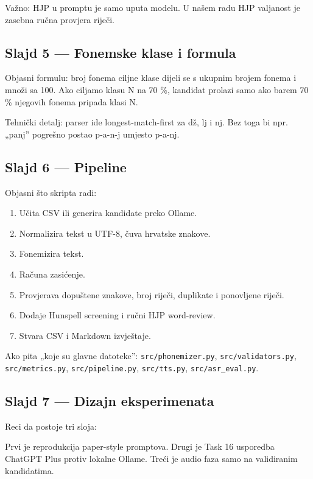 \documentclass[
]{article}
\providecommand{\tightlist}{%
  \setlength{\itemsep}{0pt}\setlength{\parskip}{0pt}}
\begin{document}
Važno: HJP u promptu je samo uputa modelu. U našem radu HJP valjanost je
zasebna ručna provjera riječi.

\subsection{Slajd 5 --- Fonemske klase i
formula}\label{slajd-5-fonemske-klase-i-formula}

Objasni formulu: broj fonema ciljne klase dijeli se s ukupnim brojem
fonema i množi sa 100. Ako ciljamo klasu N na 70 \%, kandidat prolazi
samo ako barem 70 \% njegovih fonema pripada klasi N.

Tehnički detalj: parser ide longest-match-first za dž, lj i nj. Bez toga
bi npr. „panj'' pogrešno postao p-a-n-j umjesto p-a-nj.

\subsection{Slajd 6 --- Pipeline}\label{slajd-6-pipeline}

Objasni što skripta radi:

\begin{enumerate}
\def\labelenumi{\arabic{enumi}.}
\tightlist
\item
  Učita CSV ili generira kandidate preko Ollame.
\item
  Normalizira tekst u UTF-8, čuva hrvatske znakove.
\item
  Fonemizira tekst.
\item
  Računa zasićenje.
\item
  Provjerava dopuštene znakove, broj riječi, duplikate i ponovljene
  riječi.
\item
  Dodaje Hunspell screening i ručni HJP word-review.
\item
  Stvara CSV i Markdown izvještaje.
\end{enumerate}

Ako pita „koje su glavne datoteke'': \texttt{src/phonemizer.py},
\texttt{src/validators.py}, \texttt{src/metrics.py},
\texttt{src/pipeline.py}, \texttt{src/tts.py},
\texttt{src/asr\_eval.py}.

\subsection{Slajd 7 --- Dizajn
eksperimenata}\label{slajd-7-dizajn-eksperimenata}

Reci da postoje tri sloja:

Prvi je reprodukcija paper-style promptova. Drugi je Task 16 usporedba
ChatGPT Plus protiv lokalne Ollame. Treći je audio faza samo na
validiranim kandidatima.
\end{document}
